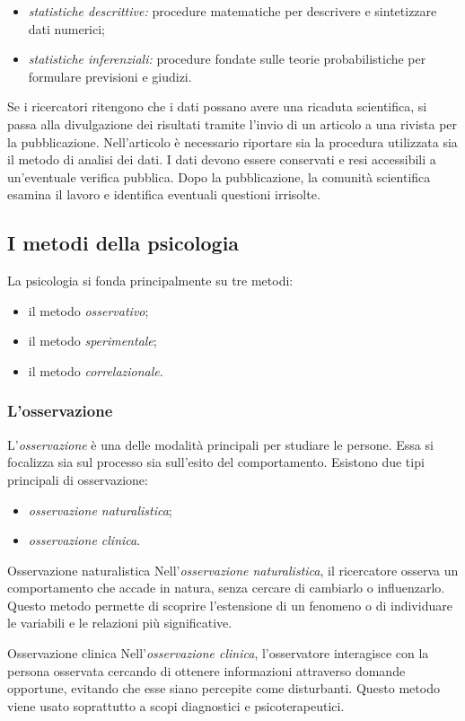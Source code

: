 \documentclass[a4paper]{article}
\begin{document}
\begin{itemize}
    \item \emph{statistiche descrittive:} procedure matematiche per descrivere e sintetizzare dati numerici;
    \item \emph{statistiche inferenziali:} procedure fondate sulle teorie probabilistiche per formulare previsioni e giudizi.
\end{itemize}
Se i ricercatori ritengono che i dati possano avere una ricaduta scientifica, si passa alla divulgazione dei risultati tramite l'invio di un articolo a una rivista per la pubblicazione. Nell'articolo è necessario riportare sia la procedura utilizzata sia il metodo di analisi dei dati. I dati devono essere conservati e resi accessibili a un'eventuale verifica pubblica.
Dopo la pubblicazione, la comunità scientifica esamina il lavoro e identifica eventuali questioni irrisolte.
\subsection{I metodi della psicologia}
La psicologia si fonda principalmente su tre metodi:
\begin{itemize}
    \item il metodo \emph{osservativo};
    \item il metodo \emph{sperimentale};
    \item il metodo \emph{correlazionale}.
\end{itemize}
\subsubsection{L'osservazione}
L'\emph{osservazione} è una delle modalità principali per studiare le persone. Essa si focalizza sia sul processo sia sull'esito del comportamento.
Esistono due tipi principali di osservazione:
\begin{itemize}
    \item \emph{osservazione naturalistica};
    \item \emph{osservazione clinica}.
\end{itemize}
\begin{snippetdefinition}{Osservazione naturalistica}
    Nell'\emph{osservazione naturalistica}, il ricercatore osserva un comportamento che accade in natura, senza cercare di cambiarlo o influenzarlo. Questo metodo permette di scoprire l'estensione di un fenomeno o di individuare le variabili e le relazioni più significative.
\end{snippetdefinition}
\begin{snippetdefinition}{Osservazione clinica}
    Nell'\emph{osservazione clinica}, l'osservatore interagisce con la persona osservata cercando di ottenere informazioni attraverso domande opportune, evitando che esse siano percepite come disturbanti. Questo metodo viene usato soprattutto a scopi diagnostici e psicoterapeutici.
\end{snippetdefinition}
\end{document}
